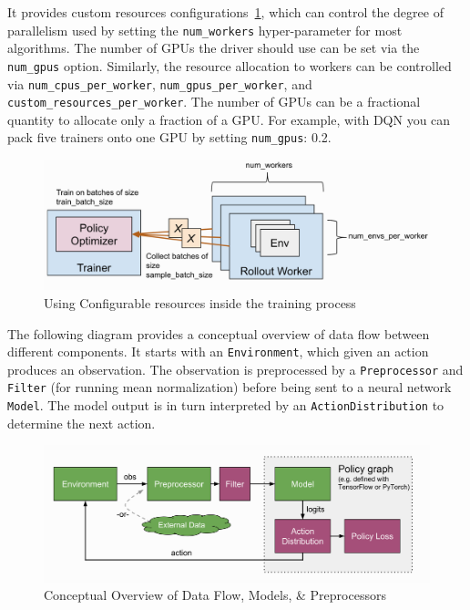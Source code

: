 It provides custom resources configurations~\ref{fig:ray_config}, which can control the degree of parallelism used by setting the \colorbox{gray!20}{\texttt{num\_workers}} hyper-parameter for most algorithms. The number of GPUs the driver should use can be set via the \colorbox{gray!20}{\texttt{num\_gpus}} option. Similarly, the resource allocation to workers can be controlled via \colorbox{gray!20}{\texttt{num\_cpus\_per\_worker}}, \colorbox{gray!20}{\texttt{num\_gpus\_per\_worker}}, and \colorbox{gray!20}{\texttt{custom\_resources\_per\_worker}}. The number of GPUs can be a fractional quantity to allocate only a fraction of a GPU. For example, with DQN you can pack five trainers onto one GPU by setting \colorbox{gray!20}{\texttt{num\_gpus}: 0.2}.
\begin{figure}[!htb]
	\centering
	\includegraphics[width=\textwidth]{figures/architecture/ray_config.png}
	\caption[Using Configurable resources inside the training process]{Using Configurable resources inside the training process\footnotemark}
	\label{fig:ray_config}
\end{figure}

The following diagram provides a conceptual overview of data flow between different components. It starts with an \colorbox{gray!20}{\texttt{Environment}}, which given an action produces an observation. The observation is preprocessed by a \colorbox{gray!20}{\texttt{Preprocessor}} and \colorbox{gray!20}{\texttt{Filter}} (for running mean normalization) before being sent to a neural network \colorbox{gray!20}{\texttt{Model}}. The model output is in turn interpreted by an \colorbox{gray!20}{\texttt{ActionDistribution}} to determine the next action.
\begin{figure}[!htb]
	\centering
	\includegraphics[width=\textwidth]{figures/architecture/ray_loop.png}
	\caption[Conceptual Overview of Data Flow, Models, \& Preprocessors]{Conceptual Overview of Data Flow, Models, \& Preprocessors\footnotemark}
	\label{fig:ray_loop}
\end{figure}

